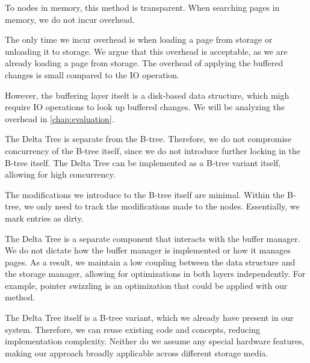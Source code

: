 To nodes in memory, this method is transparent.
When searching pages in memory, we do not incur overhead.

The only time we incur overhead is when loading a page from storage or unloading it to storage.
We argue that this overhead is acceptable, as we are already loading a page from storage.
The overhead of applying the buffered changes is small compared to the \ac{IO} operation.

However, the buffering layer itselt is a disk-based data structure, which migh require \ac{IO} operations to look up buffered changes.
We will be analyzing the overhead in \autoref{chap:evaluation}.    %

The Delta Tree is separate from the B-tree.
Therefore, we do not compromise concurrency of the B-tree itself, since we do not introduce further locking in the B-tree itself.
The Delta Tree can be implemented as a B-tree variant itself, allowing for high concurrency.

The modifications we introduce to the B-tree itself are minimal.
Within the B-tree, we only need to track the modifications made to the nodes.
Essentially, we mark entries as dirty. 

The Delta Tree is a separate component that interacts with the buffer manager.
We do not dictate how the buffer manager is implemented or how it manages pages.
As a result, we maintain a low coupling between the data structure and the storage manager, allowing for optimizations in both layers independently.
For example, pointer swizzling is an optimization that could be applied with our method.

The Delta Tree itself is a B-tree variant, which we already have present in our system.
Therefore, we can reuse existing code and concepts, reducing implementation complexity.
Neither do we assume any special hardware features, making our approach broadly applicable across different storage media.



